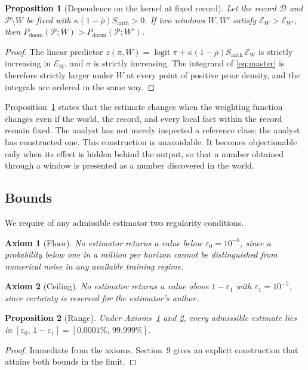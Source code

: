 \documentclass[11pt]{article}
\newtheorem{axiom}{Axiom}[section]
\newtheorem{proposition}{Proposition}[section]
\theoremstyle{remark}
\DeclareMathOperator{\logit}{logit}
\newcommand{\PD}{P_{\mathrm{doom}}}
\newcommand{\Santh}{S_{\mathrm{anth}}}
\newcommand{\rhobar}{\bar{\rho}}
\newcommand{\eone}{\varepsilon_1}
\newcommand{\ezero}{\varepsilon_0}
\begin{document}
\begin{proposition}[Dependence on the kernel at fixed record]\label{prop:kerneldep}
Let the record $\mathcal{D}$ and $\mathcal{P}\setminus W$ be fixed with $\kappa(1-\rhobar)\Santh>0$. If two windows $W,W'$ satisfy $\mathcal{E}_W>\mathcal{E}_{W'}$, then $\PD(\mathcal{P};W)>\PD(\mathcal{P};W')$.
\end{proposition}
\begin{proof}
The linear predictor $z(\pi,W)=\logit\pi+\kappa(1-\rhobar)\Santh\,\mathcal{E}_W$ is strictly increasing in $\mathcal{E}_W$, and $\sigma$ is strictly increasing. The integrand of \eqref{eq:master} is therefore strictly larger under $W$ at every point of positive prior density, and the integrals are ordered in the same way. \qedhere
\end{proof}

Proposition~\ref{prop:kerneldep} states that the estimate changes when the weighting function changes even if the world, the record, and every local fact within the record remain fixed. The analyst has not merely inspected a reference class; the analyst has constructed one. This construction is unavoidable. It becomes objectionable only when its effect is hidden behind the output, so that a number obtained through a window is presented as a number discovered in the world.

\subsection{Bounds}

We require of any admissible estimator two regularity conditions.

\begin{axiom}[Floor]\label{ax:floor}
No estimator returns a value below $\ezero=10^{-6}$, since a probability below one in a million per horizon cannot be distinguished from numerical noise in any available training regime.
\end{axiom}

\begin{axiom}[Ceiling]\label{ax:ceiling}
No estimator returns a value above $1-\eone$ with $\eone=10^{-5}$, since certainty is reserved for the estimator's author.
\end{axiom}

\begin{proposition}[Range]\label{prop:range}
Under Axioms~\ref{ax:floor} and \ref{ax:ceiling}, every admissible estimate lies in $[\ezero,\,1-\eone]=[0.0001\%,\,99.999\%]$.
\end{proposition}
\begin{proof}
Immediate from the axioms. Section~9 gives an explicit construction that attains both bounds in the limit. \qedhere
\end{proof}
\end{document}
